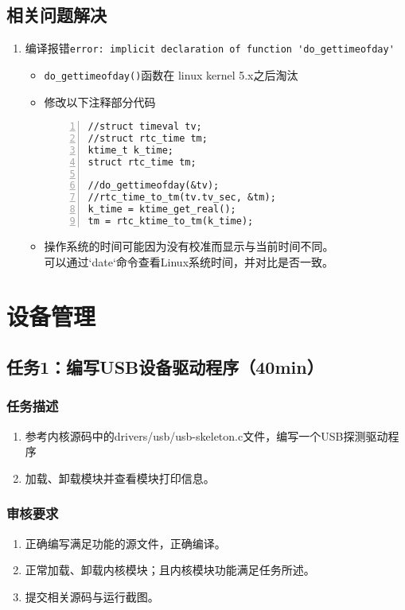 \documentclass{article}
\begin{document}
\subsection{相关问题解决}
\begin{enumerate}
	\item 编译报错\verb|error: implicit declaration of function 'do_gettimeofday'|
	      \begin{itemize}
		      \item \verb|do_gettimeofday()|函数在 linux kernel 5.x之后淘汰
		      \item 修改以下注释部分代码
		            \begin{lstlisting}[numbers=left]
//struct timeval tv;
//struct rtc_time tm;
ktime_t k_time;
struct rtc_time tm;

//do_gettimeofday(&tv);
//rtc_time_to_tm(tv.tv_sec, &tm);
k_time = ktime_get_real();
tm = rtc_ktime_to_tm(k_time); 
\end{lstlisting}
		      \item 操作系统的时间可能因为没有校准而显示与当前时间不同。\\
		            可以通过`date`命令查看Linux系统时间，并对比是否一致。
	      \end{itemize}
\end{enumerate}
\newpage
\section{设备管理}
\subsection{任务1：编写USB设备驱动程序（40min）}

\subsubsection{任务描述}
\begin{enumerate}
	\item 参考内核源码中的drivers/usb/usb-skeleton.c文件，编写一个USB探测驱动程序
	\item 加载、卸载模块并查看模块打印信息。
\end{enumerate}

\subsubsection{审核要求}
\begin{enumerate}
	\item 正确编写满足功能的源文件，正确编译。
	\item 正常加载、卸载内核模块；且内核模块功能满足任务所述。
	\item 提交相关源码与运行截图。
\end{enumerate}
\end{document}
